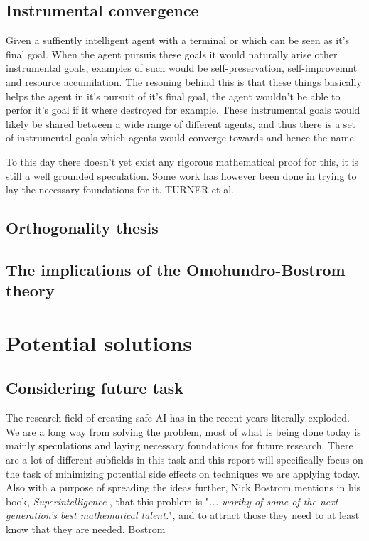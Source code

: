 \documentclass{report}
\newcommand{\autocite}{}
\theoremstyle{definition}
\begin{document}
\subsection{Instrumental convergence}
Given a suffiently intelligent agent with a terminal or which can be seen as it's final goal. When the agent pursuis these goals it would naturally arise other instrumental goals, examples of such would be self-preservation, self-improvemnt and resource accumilation. The resoning behind this is that these things basically helps the agent in it's pursuit of it's final goal, the agent wouldn't be able to perfor it's goal if it where destroyed for example. These instrumental goals would likely be shared between a wide range of different agents, and thus there is a set of instrumental goals which agents would converge towards and hence the name. 

To this day there doesn't yet exist any rigorous mathematical proof for this, it is still a well grounded speculation. Some work has however been done in trying to lay the necessary foundations for it. \autocite{TURNER et al}.

\subsection{Orthogonality thesis}


\subsection{The implications of the Omohundro-Bostrom theory}



\section{Potential solutions}

\subsection{Considering future task}



The research field of creating safe AI has in the recent years literally exploded. We are a long way from solving the problem, most of what is being done today is mainly speculations and laying necessary foundations for future research. There are a lot of different subfields in this task and this report will specifically focus on the task of minimizing potential side effects on techniques we are applying today. Also with a purpose of spreading the ideas further, Nick Bostrom mentions in his book, \textit{Superintelligence} , that this problem is "\textit{... worthy of some of the next generation's best mathematical talent.}", and to attract those they need to at least know that they are needed. 
\autocite{Bostrom}
\end{document}
